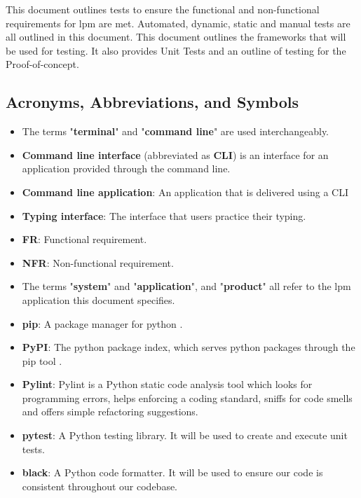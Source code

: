 \documentclass[12pt, titlepage]{article}
\begin{document}
This document outlines tests to ensure the functional and non-functional requirements for lpm are met. Automated, dynamic, static and manual tests are all outlined in this document. This document outlines the frameworks that will be used for testing. It also provides Unit Tests and an outline of testing for the Proof-of-concept.

\subsection{Acronyms, Abbreviations, and Symbols}

\begin{itemize}
    \item The terms "\textbf{terminal}" and "\textbf{command line}" are used interchangeably.
    \item \textbf{Command line interface} (abbreviated as \textbf{CLI}) is an interface for an application provided through the command line.
    \item \textbf{Command line application}: An application that is delivered using a CLI
    \item \textbf{Typing interface}: The interface that users practice their typing.
    \item \textbf{FR}: Functional requirement.
    \item \textbf{NFR}: Non-functional requirement.
    \item The terms "\textbf{system}" and "\textbf{application}", and "\textbf{product}" all refer to the lpm application this document specifies.
    \item \textbf{pip}: A package manager for python \citep{pip}.
    \item \textbf{PyPI}: The python package index, which serves python packages through the pip tool \citep{pypi}.
    \item \textbf{Pylint}: Pylint is a Python static code analysis tool which looks for programming errors, helps enforcing a coding standard, sniffs for code smells and offers simple refactoring suggestions.
    \item \textbf{pytest}: A Python testing library. It will be used to create and execute unit tests.
    \item \textbf{black}: A Python code formatter. It will be used to ensure our code is consistent throughout our codebase.
\end{itemize}

\end{document}
